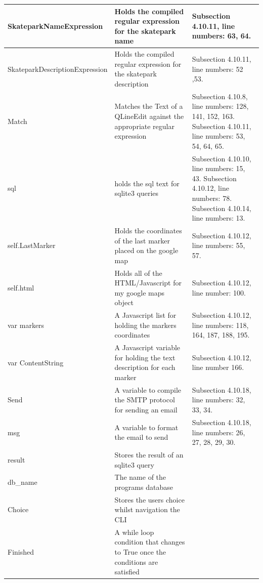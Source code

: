 \begin{center}
\begin{longtable}{|p{3.5cm}|p{6cm}|p{3.5cm}|}
SkateparkNameExpression & Holds the compiled regular expression for the skatepark name& Subsection 4.10.11, line numbers: 63, 64. \\ \hline
SkateparkDescriptionExpression & Holds the compiled regular expression for the skatepark description & Subsection 4.10.11, line numbers: 52 ,53. \\ \hline
Match & Matches the Text of a QLineEdit against the appropriate regular expression & Subsection 4.10.8, line numbers: 128, 141, 152, 163. Subsection 4.10.11, line numbers: 53, 54, 64, 65. \\ \hline
sql & holds the sql text for sqlite3 queries & Subsection 4.10.10, line numbers: 15, 43. Subsection 4.10.12, line numbers: 78. Subsection 4.10.14, line numbers: 13. \\ \hline
self.LastMarker & Holds the coordinates of the last marker placed on the google map & Subsection 4.10.12, line numbers: 55, 57. \\ \hline
self.html & Holds all of the HTML/Javascript for my google maps object & Subsection 4.10.12, line number: 100. \\ \hline
var markers & A Javascript list for holding the markers coordinates & Subsection 4.10.12, line numbers: 118, 164, 187, 188, 195. \\ \hline
var ContentString & A Javascript variable for holding the text description for each marker & Subsection 4.10.12, line number 166. \\ \hline
Send & A variable to compile the SMTP protocol for sending an email & Subsection 4.10.18, line numbers: 32, 33, 34.  \\ \hline
msg & A variable to format the email to send & Subsection 4.10.18, line numbers: 26, 27, 28, 29, 30. \\ \hline
result & Stores the result of an sqlite3 query & \\ \hline
db\_name & The name of the programs database & \\ \hline 
Choice & Stores the users choice whilst navigation the CLI & \\ \hline 
Finished & A while loop condition that changes to True once the conditions are satisfied & \\ \hline



\end{longtable}
\label{tab:Variable List}
\end{center}






